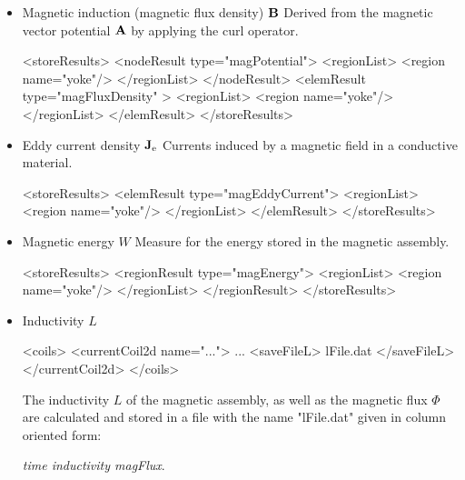 \begin{itemize}
\item Magnetic induction (magnetic flux density) ${\bf B}$
    \newline Derived from the magnetic vector potential ${\bf A}$ by
    applying the curl operator.
  
\begin{xmllisting}
<storeResults>
   <nodeResult type="magPotential">
     <regionList>
      <region name="yoke"/>
     </regionList>
   </nodeResult>
   <elemResult type="magFluxDensity" >
     <regionList>
      <region name="yoke"/>
     </regionList>
   </elemResult>
</storeResults>
\end{xmllisting}
  
\item Eddy current density ${\bf J}_{\rm e}$ 
    \newline Currents induced by a magnetic field in a conductive
    material. 

\begin{xmllisting}
<storeResults>
   <elemResult type="magEddyCurrent">
     <regionList>
      <region name="yoke"/>
     </regionList>
   </elemResult>
</storeResults>
\end{xmllisting}
  
  
\item Magnetic energy $W$ 
    \newline Measure for the energy stored in the magnetic assembly.
  
\begin{xmllisting}
<storeResults>
   <regionResult type="magEnergy">
     <regionList>
      <region name="yoke"/>
     </regionList>
   </regionResult>
</storeResults>
\end{xmllisting}

\item  Inductivity $L$ 

\begin{xmllisting}
<coils>
  <currentCoil2d name="...">
     ...
    <saveFileL> lFile.dat </saveFileL>
  </currentCoil2d>
</coils>
\end{xmllisting}

The inductivity $L$ of the magnetic assembly, as well as
the magnetic flux $\Phi$ are calculated and stored in a file with
the name "lFile.dat"  given in column oriented form:

{\em time inductivity magFlux}.  
  


\end{itemize}

